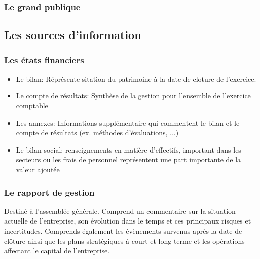 \documentclass{article}
\begin{document}
\subsubsection*{Le grand publique}

\subsection{Les sources d'information}
\subsubsection*{Les états financiers}
\begin{itemize}
    \item Le bilan: Réprésente sitation du patrimoine à la date de cloture de l'exercice. 
    \item Le compte de résultats: Synthèse de la gestion pour l'ensemble de l'exercice comptable
    \item Les annexes: Informations supplémentaire qui commentent le bilan et le compte de résultats (ex. méthodes d'évaluations, ...)
    \item Le bilan social: renseignements en matière d'effectifs, important dans les secteurs ou les frais de personnel représentent une part importante de la valeur ajoutée
\end{itemize}

\subsubsection*{Le rapport de gestion}
Destiné à l'assemblée générale. Comprend un commentaire sur la situation actuelle de l'entreprise, son évolution dans le temps et ces principaux risques et incertitudes. Comprends également les évènements survenus après la date de clôture ainsi que les plans stratégiques à court et long terme et les opérations affectant le capital de l'entreprise. 
\end{document}
